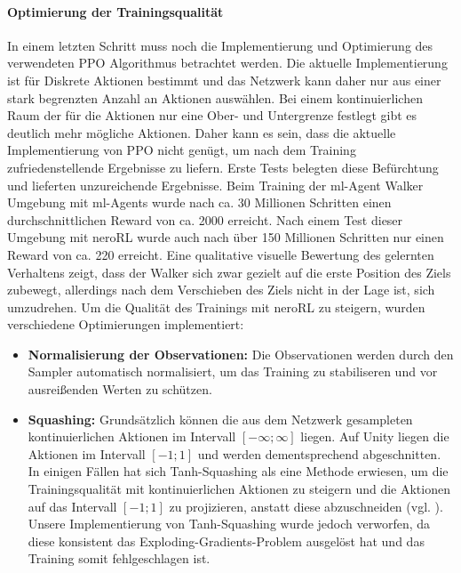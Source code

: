 \paragraph{Optimierung der Trainingsqualität} \fup
In einem letzten Schritt muss noch die Implementierung und Optimierung des verwendeten PPO Algorithmus betrachtet werden. Die aktuelle Implementierung ist für Diskrete Aktionen bestimmt und das Netzwerk kann daher nur aus einer stark begrenzten Anzahl an Aktionen auswählen. Bei einem kontinuierlichen Raum der für die Aktionen nur eine Ober- und Untergrenze festlegt gibt es deutlich mehr mögliche Aktionen. Daher kann es sein, dass die aktuelle Implementierung von PPO nicht genügt, um nach dem Training zufriedenstellende Ergebnisse zu liefern. Erste Tests belegten diese Befürchtung und lieferten unzureichende Ergebnisse. Beim Training der ml-Agent Walker Umgebung mit ml-Agents wurde nach ca. 30 Millionen Schritten einen durchschnittlichen Reward von ca. 2000 erreicht. Nach einem Test dieser Umgebung mit neroRL wurde auch nach über 150 Millionen Schritten nur einen Reward von ca. 220 erreicht.
Eine qualitative visuelle Bewertung des gelernten Verhaltens zeigt, dass der Walker sich zwar gezielt auf die erste Position des Ziels zubewegt, allerdings nach dem Verschieben des Ziels nicht in der Lage ist, sich umzudrehen. 
Um die Qualität des Trainings mit neroRL zu steigern, wurden verschiedene Optimierungen implementiert:

\begin{itemize}
	\item \textbf{Normalisierung der Observationen:} Die Observationen werden durch den Sampler automatisch normalisiert, um das Training zu stabiliseren und vor ausreißenden Werten zu schützen.
	\item \textbf{Squashing:} Grundsätzlich können die aus dem Netzwerk gesampleten kontinuierlichen Aktionen im Intervall $[-\infty;\infty]$ liegen. Auf Unity liegen die Aktionen im Intervall $[-1;1]$ und werden dementsprechend abgeschnitten. In einigen Fällen hat sich Tanh-Squashing als eine Methode erwiesen, um die Trainingsqualität mit kontinuierlichen Aktionen zu steigern und die Aktionen auf das Intervall $[-1;1]$ zu projizieren, anstatt diese abzuschneiden (vgl. \cite{shengyi2022the37implementation}). Unsere Implementierung von Tanh-Squashing wurde jedoch verworfen, da diese konsistent das Exploding-Gradients-Problem ausgelöst hat und das Training somit fehlgeschlagen ist. 
\end{itemize}

